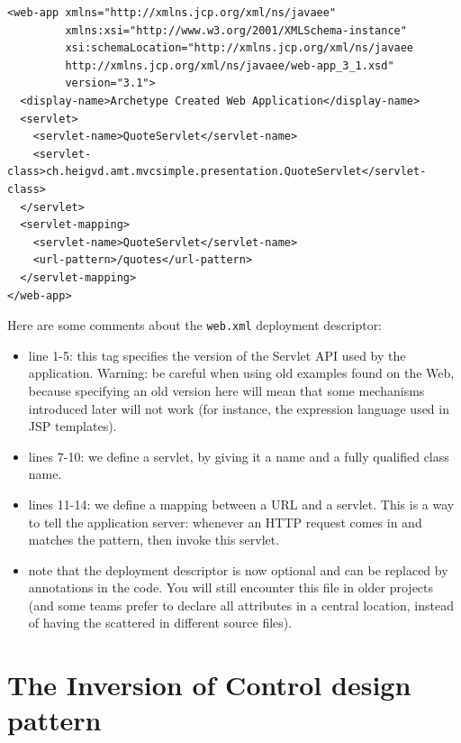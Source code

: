 \vspace{10pt}
\begin{minipage}{\linewidth}
\begin{lstlisting}[frame=single]
<web-app xmlns="http://xmlns.jcp.org/xml/ns/javaee"
         xmlns:xsi="http://www.w3.org/2001/XMLSchema-instance"
         xsi:schemaLocation="http://xmlns.jcp.org/xml/ns/javaee
		 http://xmlns.jcp.org/xml/ns/javaee/web-app_3_1.xsd"
         version="3.1">
  <display-name>Archetype Created Web Application</display-name>
  <servlet>
    <servlet-name>QuoteServlet</servlet-name>
    <servlet-class>ch.heigvd.amt.mvcsimple.presentation.QuoteServlet</servlet-class>
  </servlet>
  <servlet-mapping>
    <servlet-name>QuoteServlet</servlet-name>
    <url-pattern>/quotes</url-pattern>
  </servlet-mapping>
</web-app>
\end{lstlisting}
\end{minipage}

Here are some comments about the \texttt{web.xml} deployment descriptor:

\begin{itemize}
\item line 1-5: this tag specifies the version of the Servlet API used by the application. Warning: be careful when using old examples found on the Web, because specifying an old version here will mean that some mechanisms introduced later will not work (for instance, the expression language used in \ac{JSP} templates).
\item lines 7-10: we define a servlet, by giving it a name and a fully qualified class name.
\item lines 11-14: we define a mapping between a URL and a servlet. This is a way to tell the application server: whenever an HTTP request comes in and matches the pattern, then invoke this servlet.
\item note that the deployment descriptor is now optional and can be replaced by annotations in the code. You will still encounter this file in older projects (and some teams prefer to declare all attributes in a central location, instead of having the scattered in different source files). 
\end{itemize}

\section{The Inversion of Control design pattern}


